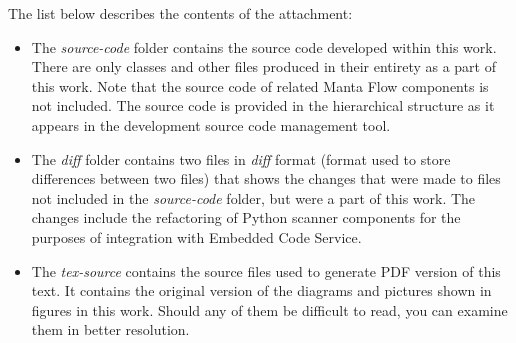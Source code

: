 \documentclass[12pt,a4paper]{report}
\let\openright=\clearpage
\begin{document}
The list below describes the contents of the attachment:
\begin{itemize}
    \item The \textit{source-code} folder contains the source code developed within this work. There are only classes and other files produced in their entirety as a part of this work. Note that the source code of related Manta Flow components is not included. The source code is provided in the hierarchical structure as it appears in the development source code management tool.
    \item The \textit{diff} folder contains two files in \textit{diff} format (format used to store differences between two files) that shows the changes that were made to files not included in the \textit{source-code} folder, but were a part of this work. The changes include the refactoring of Python scanner components for the purposes of integration with Embedded Code Service.
    \item The \textit{tex-source} contains the source files used to generate PDF version of this text. It contains the original version of the diagrams and pictures shown in figures in this work. Should any of them be difficult to read, you can examine them in better resolution.
\end{itemize}

\openright
\end{document}
